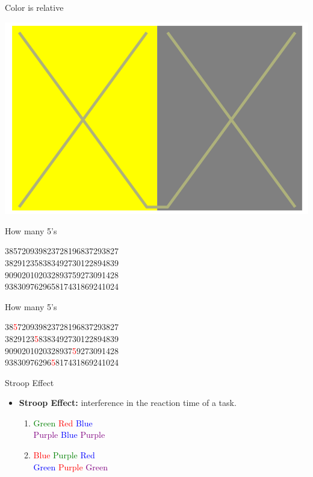 \documentclass{beamer}
\begin{document}
\begin{frame}{Color is relative}
    \begin{center}
        \includegraphics[scale=0.3]{visualParadox3.png}
    \end{center}
\end{frame}  

\begin{frame}{How many 5's} 
    \begin{center}
        385720939823728196837293827 \\
        382912358383492730122894839 \\
        909020102032893759273091428 \\
        938309762965817431869241024 \\
    \end{center}
\end{frame}  
\begin{frame}{How many 5's} 
    \begin{center}
        38\textcolor{red}{5}720939823728196837293827 \\
        3829123\textcolor{red}{5}8383492730122894839 \\
        9090201020328937\textcolor{red}{5}9273091428 \\
        93830976296\textcolor{red}{5}817431869241024 \\
    \end{center}
\end{frame}  

\begin{frame}{Stroop Effect}
    \begin{itemize}
        \item {\bf Stroop Effect:} interference in the reaction time of a task. 
        \begin{enumerate}
            \item \textcolor{green}{Green} \textcolor{red}{Red} \textcolor{blue}{Blue} \\ \textcolor{purple}{Purple} \textcolor{blue}{Blue} \textcolor{purple}{Purple}
            \item \textcolor{red}{Blue} \textcolor{green}{Purple} \textcolor{blue}{Red} \\ \textcolor{blue}{Green} \textcolor{red}{Purple} \textcolor{purple}{Green}
        \end{enumerate}
    \end{itemize}
\end{frame}  
\end{document}
